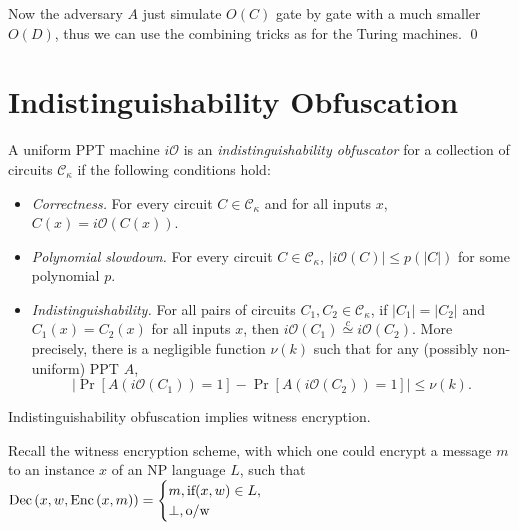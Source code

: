 Now the adversary $A$ just simulate $O(C)$ gate by gate with a much smaller $O(D)$, thus we can use the combining tricks as for the Turing machines.
\qed

\section{Indistinguishability Obfuscation}



\newcommand{\iO}{\ensuremath{i\mathcal{O}}}
\newcommand{\Ck}{\ensuremath{\mathcal{C}_\kappa}}

\begin{definition}
A uniform PPT machine $\iO$ is an \emph{indistinguishability obfuscator}
for a collection of circuits $\Ck$ if the following conditions hold:
\begin{itemize}

\item \emph{Correctness.}
For every circuit $C \in \Ck$ and for all inputs $x$,
$C(x) = \iO(C(x))$.

\item \emph{Polynomial slowdown.}
For every circuit $C \in \Ck$, $|\iO(C)| \leq p(|C|)$ for some
polynomial $p$.

\item \emph{Indistinguishability.}
For all pairs of circuits $C_1, C_2 \in \Ck$, if $|C_1| = |C_2|$ and
$C_1(x) = C_2(x)$ for all inputs $x$, then
$\iO(C_1) \overset{c}{\simeq} \iO(C_2)$.
More precisely, there is a negligible function $\nu(k)$ such that for
any (possibly non-uniform) PPT $A$,
\begin{equation*}
\big| \Pr[A(\iO(C_1)) = 1] - \Pr[A(\iO(C_2)) = 1] \big| \leq \nu(k).
\end{equation*}

\end{itemize}
\end{definition}


\begin{proposition}
	Indistinguishability obfuscation implies witness encryption.
\end{proposition}
\proof
Recall the witness encryption scheme, with which one could encrypt a message $m$ to an instance $x$ of an NP language $L$, such that $\mathop{\mathrm{Dec}}\left(x,w,\mathop{\mathrm{Enc}}\left(x,m\right)\right)=
\begin{cases}
	m, \hbox{if} (x,w)\in L, \\
	\bot, \hbox{o/w}
\end{cases}$

